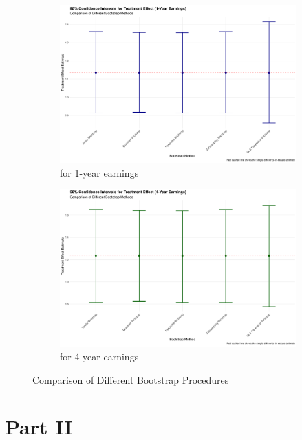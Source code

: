 \documentclass[11pt]{article}
\numberwithin{equation}{section}
\begin{document}
\begin{figure}[h]
    \centering
    \begin{subfigure}{0.48\textwidth}
    \includegraphics[width=\textwidth]{output/bootstrap_comparison_1yr.png}
    \caption{\label{fig:bootstrap_comparison_1yr}for 1-year earnings}
    \end{subfigure}
    \begin{subfigure}{0.48\textwidth}
    \includegraphics[width=\textwidth]{output/bootstrap_comparison_4yr.png}
    \caption{\label{fig:bootstrap_comparison_4yr}for 4-year earnings}
    \end{subfigure}
    \caption{\label{fig:bootstrap_comparison}Comparison of Different Bootstrap Procedures}
\end{figure}






\section{Part II}
\end{document}

